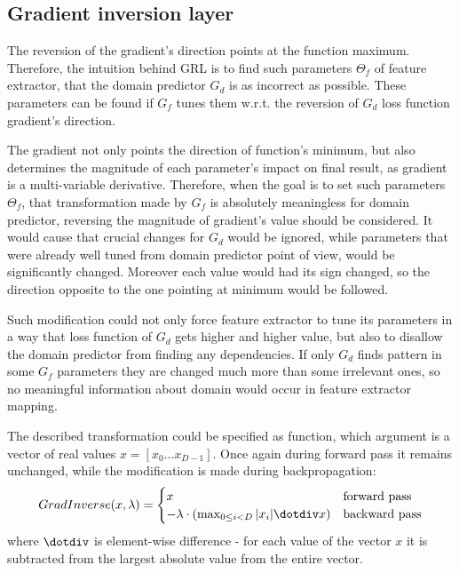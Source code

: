\documentclass{article}
\begin{document}
\subsection{Gradient inversion layer}
The reversion of the gradient's direction points at the function maximum. Therefore, the intuition behind GRL is to find such parameters $\Theta_{f}$ of feature extractor, that the domain predictor $G_{d}$ is as incorrect as possible. These parameters can be found if $G_{f}$ tunes them w.r.t. the reversion of $G_{d}$ loss function gradient's direction.
\par
The gradient not only points the direction of function's minimum, but also determines the magnitude of each parameter's impact on final result, as gradient is a multi-variable derivative. Therefore, when the goal is to set such parameters $\Theta_{f}$, that transformation made by $G_{f}$ is absolutely meaningless for domain predictor, reversing the magnitude of gradient's value should be considered. It would cause that crucial changes for $G_{d}$ would be ignored, while parameters that were already well tuned from domain predictor point of view, would be significantly changed. Moreover each value would had its sign changed, so the direction opposite to the one pointing at minimum would be followed. 
\par
Such modification could not only force feature extractor to tune its parameters in a way that loss function of $G_{d}$ gets higher and higher value, but also to disallow the domain predictor from finding any dependencies. If only $G_{d}$ finds pattern in some $G_{f}$ parameters they are changed much more than some irrelevant ones, so no meaningful information about domain would occur in feature extractor mapping. 
\par
The described transformation could be specified as function, which argument is a vector of real values $x = [x_{0}...x_{D-1}]$. Once again during forward pass it remains unchanged, while the modification is made during backpropagation:
\begin{equation*}
GradInverse(x, \lambda) = \begin{cases}
x &\text{forward pass}\\
-\lambda \cdot (\max_{0 \leq i < D} |x_{i}| \dotdiv x) &\text{backward pass}
\end{cases}
\end{equation*}
where $\dotdiv$ is element-wise difference - for each value of the vector $x$ it is subtracted from the largest absolute value from the entire vector.
\par
\end{document}
